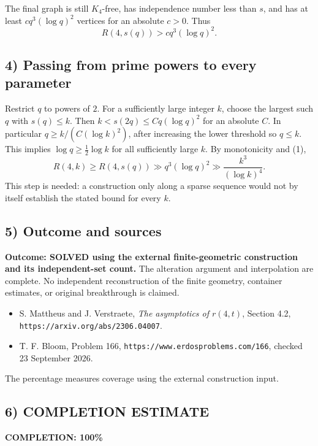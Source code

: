 The final graph is still $K_4$-free, has independence number less than
$s$, and has at least $c q^3(\log q)^2$ vertices for an absolute $c>0$.
Thus
\[
 R(4,s(q))>c q^3(\log q)^2.                              \tag{1}
\]

\subsection{4) Passing from prime powers to every parameter}
Restrict $q$ to powers of $2$. For a sufficiently large integer $k$,
choose the largest such $q$ with $s(q)\leq k$. Then
$k<s(2q)\leq Cq(\log q)^2$ for an absolute $C$.
In particular $q\geq k/(C(\log k)^2)$, after increasing the lower
threshold so $q\leq k$. This implies $\log q\geq\frac12\log k$
for all sufficiently large $k$. By monotonicity and (1),
\[
 R(4,k)\geq R(4,s(q))
 \gg q^3(\log q)^2
 \gg\frac{k^3}{(\log k)^4}.
\]
This step is needed: a construction only along a sparse sequence would
not by itself establish the stated bound for every $k$.

\subsection{5) Outcome and sources}
\textbf{Outcome: SOLVED using the external finite-geometric construction
and its independent-set count.} The alteration argument and interpolation
are complete. No independent reconstruction of the finite geometry,
container estimates, or original breakthrough is claimed.
\begin{itemize}
\item S. Mattheus and J. Verstraete, \emph{The asymptotics of $r(4,t)$},
Section 4.2, \texttt{https://arxiv.org/abs/2306.04007}.
\item T. F. Bloom, Problem 166,
\texttt{https://www.erdosproblems.com/166}, checked 23 September 2026.
\end{itemize}
The percentage measures coverage using the external construction input.
\subsection{6) COMPLETION ESTIMATE}
\textbf{COMPLETION: 100\%}
